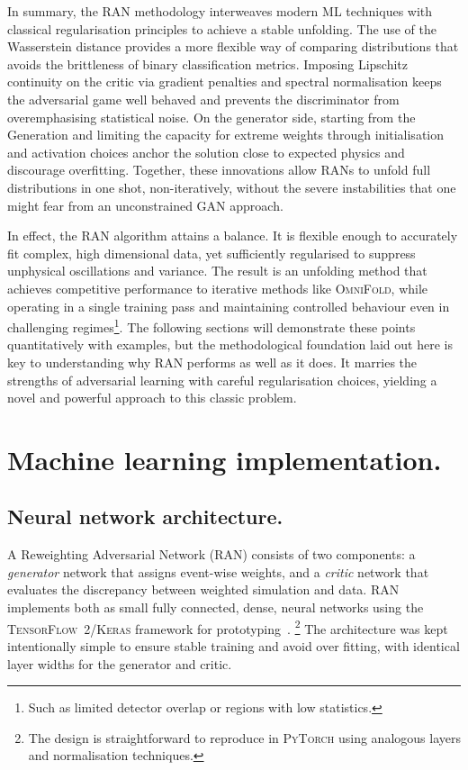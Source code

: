 {{    In summary, the RAN methodology interweaves modern ML techniques with classical regularisation principles to achieve a stable unfolding.
    The use of the Wasserstein distance provides a more flexible way of comparing distributions that avoids the brittleness of binary classification metrics.
     Imposing Lipschitz continuity on the critic via gradient penalties and spectral normalisation keeps the adversarial game well behaved and prevents the discriminator from overemphasising statistical noise.
    On the generator side, starting from the Generation and limiting the capacity for extreme weights through initialisation and activation choices anchor the solution close to expected physics and discourage overfitting.
    Together, these innovations allow RANs to unfold full distributions in one shot, non-iteratively, without the severe instabilities that one might fear from an unconstrained GAN approach.
    
    In effect, the RAN algorithm attains a balance.
    It is flexible enough to accurately fit complex, high dimensional data, yet sufficiently regularised to suppress unphysical oscillations and variance.
    The result is an unfolding method that achieves competitive performance to iterative methods like \textsc{OmniFold}, while operating in a single training pass and maintaining controlled behaviour even in challenging regimes\footnote{Such as limited detector overlap or regions with low statistics.}.
    The following sections will demonstrate these points quantitatively with examples, but the methodological foundation laid out here is key to understanding why RAN performs as well as it does.
    It marries the strengths of adversarial learning with careful regularisation choices, yielding a novel and powerful approach to this classic problem.
    
\section{Machine learning implementation.}
\label{sec:ran-ml-implementation}
\sectionminitoc
    \subsection{Neural network architecture.}
        A Reweighting Adversarial Network (RAN) consists of two components: a \emph{generator} network that assigns event-wise weights, and a \emph{critic} network that evaluates the discrepancy between weighted simulation and data.
        RAN implements both as small fully connected, dense, neural networks using the \textsc{TensorFlow~2/Keras} framework for prototyping~\cite{Abadi2016TensorFlow:Learning, chollet2015keras}.
        \footnote{The design is straightforward to reproduce in \textsc{PyTorch} using analogous layers and normalisation techniques.}
        The architecture was kept intentionally simple to ensure stable training and avoid over fitting, with identical layer widths for the generator and critic.

}}
